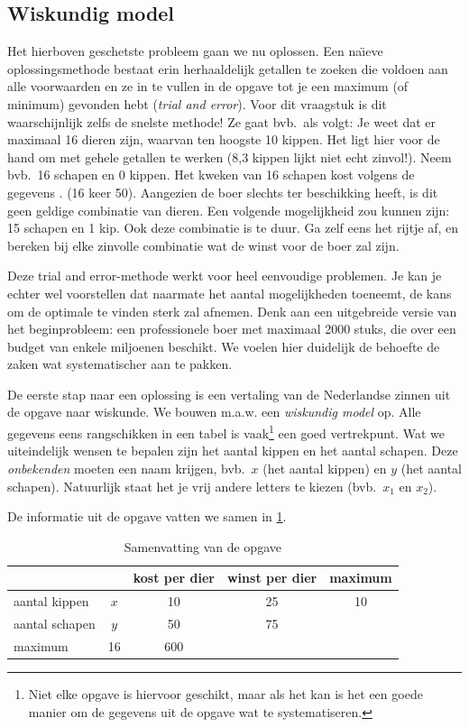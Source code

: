 \subsection{Wiskundig model}

Het hierboven geschetste probleem gaan we nu oplossen.
Een na\"{\i}eve oplossingsmethode bestaat erin herhaaldelijk getallen
te zoeken die voldoen aan alle voorwaarden en ze in te vullen
in de opgave tot je een maximum (of minimum) gevonden hebt (\textit{trial
and error}). Voor dit vraagstuk is dit waarschijnlijk zelfs de
snelste methode! Ze gaat bvb.\ als volgt: Je weet dat er maximaal
16 dieren zijn, waarvan ten hoogste 10 kippen. Het ligt hier
voor de hand om met gehele getallen te werken (8,3 kippen lijkt
niet echt zinvol!). Neem bvb.\ 16 schapen en 0 kippen. Het kweken
van 16 schapen kost volgens de gegevens . (16 keer 50).
Aangezien de boer slechts  ter beschikking heeft, is
dit geen geldige combinatie van dieren. Een volgende mogelijkheid
zou kunnen zijn: 15 schapen en 1 kip. Ook deze combinatie is
te duur. Ga zelf eens het rijtje af, en bereken bij elke zinvolle
combinatie wat de winst voor de boer zal zijn.


Deze trial and error-methode werkt voor heel eenvoudige problemen.
Je kan je echter wel voorstellen dat naarmate het aantal mogelijkheden
toeneemt, de kans om de optimale te vinden sterk zal afnemen.
Denk aan een uitgebreide versie van het beginprobleem: een professionele
boer met maximaal 2000 stuks, die over een budget van enkele
miljoenen beschikt. We voelen hier duidelijk de behoefte de zaken
wat systematischer aan te pakken.

De eerste stap naar een oplossing is een vertaling van de Nederlandse
zinnen uit de opgave naar wiskunde. We bouwen m.a.w. een \textit{wiskundig
model} op. Alle gegevens eens rangschikken in een tabel is
vaak\footnote{Niet elke opgave is hiervoor geschikt, maar als het kan
is het een goede manier om de gegevens uit de opgave wat te
systematiseren.}
een goed vertrekpunt. Wat we uiteindelijk wensen te bepalen zijn
het aantal kippen en het aantal schapen. Deze \textit{onbekenden}
moeten een naam krijgen, bvb.\ $x$ (het aantal kippen) en $y$
(het aantal schapen). Natuurlijk staat het je vrij andere letters
te kiezen (bvb.\ $x_{1}$ en $x_{2}$).

De informatie uit de opgave vatten we samen in \cref{tbl:opg1}.
\begin{table}[htbp]
    \centering
    \caption{Samenvatting van de opgave}
    \begin{tabular}{lcccc}
        \toprule
         & & kost per dier & winst per dier & maximum \\
        \midrule
        aantal kippen & $x$ & 10 & 25 & 10  \\
        aantal schapen & $y$ & 50 & 75 &  \\
        \cmidrule{2-3}
        maximum & 16  & 600 & &  \\
    \bottomrule
    \end{tabular}
    \label{tbl:opg1}
\end{table}


